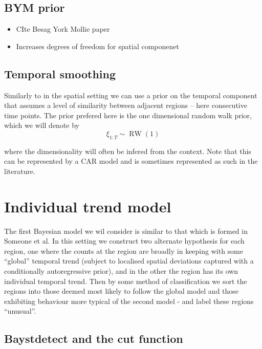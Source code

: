 \documentclass{article}
\begin{document}
\subsection{BYM prior}

\begin{itemize}
\item CIte Besag York Mollie paper
\item Increases degrees of freedom for spatial componenet
\end{itemize}

\subsection{Temporal smoothing}

Similarly to in the spatial setting we can use a prior on the temporal component that assumes a level of similarity between adjacent regions -- here consecutive time points. The prior prefered here is the one dimensional random walk prior, which we will denote by
\begin{equation}
\xi_{1:T} \sim \operatorname{RW}(1)
\end{equation}

where the dimensionality will often be infered from the context. Note that this can be represented by a CAR model and is sometimes represented as such in the literature. 

\section{Individual trend model}

The first Bayesian model we wil consider is similar to that which is formed in Someone et al. In this setting we construct two alternate hypothesis for each region, one where the counts at the region are broadly in keeping with some ``global'' temporal trend (subject to localised spatial deviations captured with a conditionally autoregressive prior), and in the other the region has its own individual temporal trend. Then by some method of classification we sort the regions into those deemed most likely to follow the global model and those exhibiting behaviour more typical of the second model - and label these regions ``unusual''.

\subsection{Baystdetect and the cut function}
\end{document}
